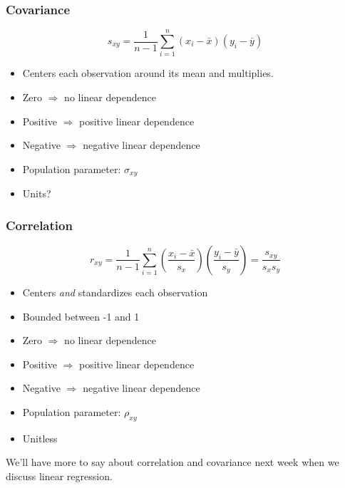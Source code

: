 \documentclass[handout]{beamer}
\begin{document}
\begin{frame}
\frametitle{Covariance}
	$$s_{xy} = \frac{1}{n-1} \sum_{i=1}^n (x_i -\bar{x})(y_i - \bar{y})$$

\begin{itemize}
	\item Centers each observation around its mean and multiplies.\pause
	\item Zero $\Rightarrow$ no linear dependence\pause
	\item Positive $\Rightarrow$ positive linear dependence\pause
	\item Negative $\Rightarrow$ negative linear dependence\pause
	\item Population parameter: $\sigma_{xy}$\pause
	\item Units?
\end{itemize}
\end{frame}
\begin{frame}
\frametitle{Correlation}
	$$r_{xy} = \frac{1}{n-1} \sum_{i=1}^n \left(\frac{x_i -\bar{x}}{s_x}\right)\left(\frac{y_i - \bar{y}}{s_y}\right) = \frac{s_{xy}}{s_x s_y}$$

\begin{itemize}
	\item Centers \emph{and} standardizes each observation \pause
	\item Bounded between -1 and 1 \pause
	\item Zero $\Rightarrow$ no linear dependence\pause
	\item Positive $\Rightarrow$ positive linear dependence\pause
	\item Negative $\Rightarrow$ negative linear dependence\pause
	\item Population parameter: $\rho_{xy}$\pause
	\item Unitless
\end{itemize}
\end{frame}
\begin{frame}
\Large \alert{We'll have more to say about correlation and covariance next week when we discuss linear regression.}
\end{frame}
\end{document}
